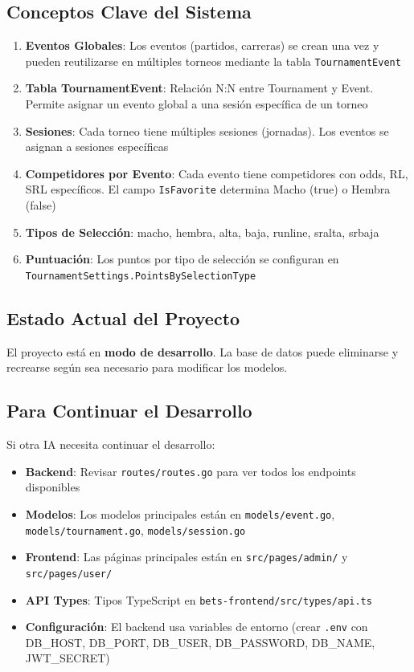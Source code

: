 \documentclass[12pt,a4paper]{article}
\begin{document}
\subsection{Conceptos Clave del Sistema}
\begin{enumerate}
    \item \textbf{Eventos Globales}: Los eventos (partidos, carreras) se crean una vez y pueden reutilizarse en múltiples torneos mediante la tabla \texttt{TournamentEvent}
    
    \item \textbf{Tabla TournamentEvent}: Relación N:N entre Tournament y Event. Permite asignar un evento global a una sesión específica de un torneo
    
    \item \textbf{Sesiones}: Cada torneo tiene múltiples sesiones (jornadas). Los eventos se asignan a sesiones específicas
    
    \item \textbf{Competidores por Evento}: Cada evento tiene competidores con odds, RL, SRL específicos. El campo \texttt{IsFavorite} determina Macho (true) o Hembra (false)
    
    \item \textbf{Tipos de Selección}: macho, hembra, alta, baja, runline, sralta, srbaja
    
    \item \textbf{Puntuación}: Los puntos por tipo de selección se configuran en \texttt{TournamentSettings.PointsBySelectionType}
\end{enumerate}

\subsection{Estado Actual del Proyecto}
El proyecto está en \textbf{modo de desarrollo}. La base de datos puede eliminarse y recrearse según sea necesario para modificar los modelos.

\subsection{Para Continuar el Desarrollo}
Si otra IA necesita continuar el desarrollo:
\begin{itemize}
    \item \textbf{Backend}: Revisar \texttt{routes/routes.go} para ver todos los endpoints disponibles
    \item \textbf{Modelos}: Los modelos principales están en \texttt{models/event.go}, \texttt{models/tournament.go}, \texttt{models/session.go}
    \item \textbf{Frontend}: Las páginas principales están en \texttt{src/pages/admin/} y \texttt{src/pages/user/}
    \item \textbf{API Types}: Tipos TypeScript en \texttt{bets-frontend/src/types/api.ts}
    \item \textbf{Configuración}: El backend usa variables de entorno (crear \texttt{.env} con DB_HOST, DB_PORT, DB_USER, DB_PASSWORD, DB_NAME, JWT_SECRET)
\end{itemize}
\end{document}
